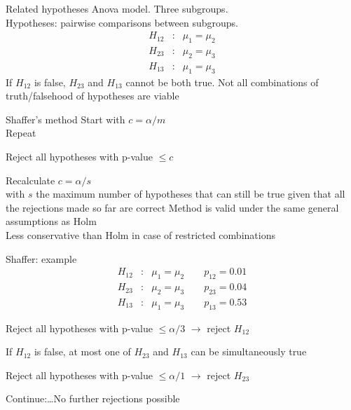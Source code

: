 \begin{frame}{Related hypotheses}
    Anova model. Three subgroups.\\
    Hypotheses: pairwise comparisons between subgroups.
    \begin{eqnarray*}
      H_{12}&:& \mu_1=\mu_2\\
      H_{23}&:& \mu_2=\mu_3\\
      H_{13}&:& \mu_1=\mu_3
    \end{eqnarray*}
  \eb
    If $H_{12}$ is false, $H_{23}$ and $H_{13}$ cannot be both true.
  \eb
    Not all combinations of truth/falsehood of hypotheses are viable
  \eb
\end{frame}


\begin{frame}{Shaffer's method}
    Start with $c = \alpha/m$
    \\ Repeat
    \be
      \item Reject all hypotheses with p-value $\leq c$
      \item Recalculate $c = \alpha/s$ \\ with $s$ the maximum number of hypotheses that can still be true given that all the rejections made so far are correct
    \ee
  \eb
    Method is valid under the same general assumptions as Holm
    \\ Less conservative than Holm in case of restricted combinations
  \eb
\end{frame}

\begin{frame}{Shaffer: example}
    \begin{eqnarray*}
      H_{12}&:& \mu_1=\mu_2 \qquad p_{12} = 0.01\\
      H_{23}&:& \mu_2=\mu_3 \qquad p_{23} = 0.04\\
      H_{13}&:& \mu_1=\mu_3 \qquad p_{13} = 0.53
    \end{eqnarray*}
  \eb
    \be
      \item Reject all hypotheses with p-value $\leq \alpha/3$ $\to$ reject $H_{12}$
      \item If $H_{12}$ is false, at most one of $H_{23}$ and $H_{13}$ can be simultaneously true
      \item Reject all hypotheses with p-value $\leq \alpha/1$  $\to$ reject $H_{23}$
      \item Continue:\ldots No further rejections possible
    \ee
  \eb
\end{frame}

